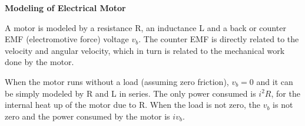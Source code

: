 
\usepackage{html}

{\bf Modeling of Electrical Motor}

A motor is modeled by a resistance R, an inductance L and a back or counter 
EMF (electromotive force) voltage $v_b$. The counter EMF is directly related to 
the velocity and angular velocity, which in turn is related to the mechanical 
work done by the motor.

When the motor runs without a load (assuming zero friction), $v_b=0$ and it 
can be simply modeled by R and L in series. The only power consumed is $i^2R$, 
for the internal heat up of the motor due to R. When the load is not zero, the 
$v_b$ is not zero and the power consumed by the motor is $i v_b$. 


